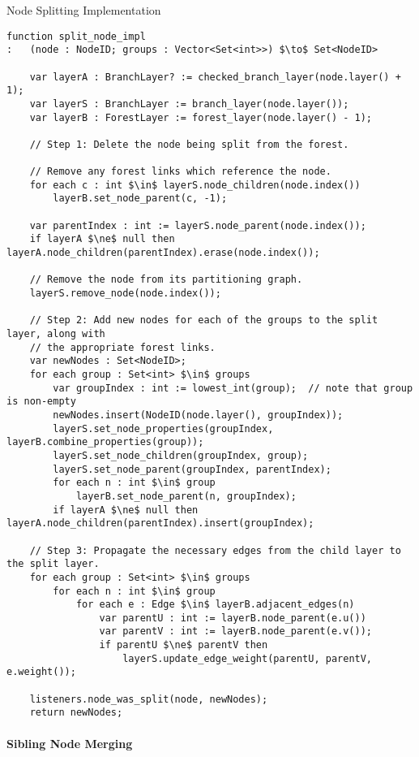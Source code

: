 \begin{stulisting}[p]
\caption{Node Splitting Implementation}
\label{code:ipfs-forest-splitnodeimpl}
\begin{lstlisting}[style=Default]
function split_node_impl
:	(node : NodeID; groups : Vector<Set<int>>) $\to$ Set<NodeID>

	var layerA : BranchLayer? := checked_branch_layer(node.layer() + 1);
	var layerS : BranchLayer := branch_layer(node.layer());
	var layerB : ForestLayer := forest_layer(node.layer() - 1);

	// Step 1: Delete the node being split from the forest.

	// Remove any forest links which reference the node.
	for each c : int $\in$ layerS.node_children(node.index())
		layerB.set_node_parent(c, -1);

	var parentIndex : int := layerS.node_parent(node.index());
	if layerA $\ne$ null then layerA.node_children(parentIndex).erase(node.index());

	// Remove the node from its partitioning graph.
	layerS.remove_node(node.index());

	// Step 2: Add new nodes for each of the groups to the split layer, along with
	// the appropriate forest links.
	var newNodes : Set<NodeID>;
	for each group : Set<int> $\in$ groups
		var groupIndex : int := lowest_int(group);	// note that group is non-empty
		newNodes.insert(NodeID(node.layer(), groupIndex));
		layerS.set_node_properties(groupIndex, layerB.combine_properties(group));
		layerS.set_node_children(groupIndex, group);
		layerS.set_node_parent(groupIndex, parentIndex);
		for each n : int $\in$ group
			layerB.set_node_parent(n, groupIndex);
		if layerA $\ne$ null then layerA.node_children(parentIndex).insert(groupIndex);

	// Step 3: Propagate the necessary edges from the child layer to the split layer.
	for each group : Set<int> $\in$ groups
		for each n : int $\in$ group
			for each e : Edge $\in$ layerB.adjacent_edges(n)
				var parentU : int := layerB.node_parent(e.u())
				var parentV : int := layerB.node_parent(e.v());
				if parentU $\ne$ parentV then
					layerS.update_edge_weight(parentU, parentV, e.weight());

	listeners.node_was_split(node, newNodes);
	return newNodes;
\end{lstlisting}
\end{stulisting}

\paragraph{Sibling Node Merging}

